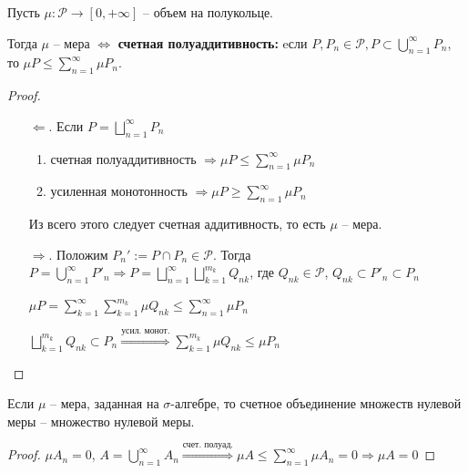 \begin{theorem}
    Пусть $\mu: \mathcal{P} \rightarrow [0, +\infty]$ – объем на полукольце. 
    
    Тогда $\mu $ – мера $\Leftrightarrow$ \textbf{счетная полуаддитивность:} eсли $P, P_n\in \mathcal{P}, P \subset\bigcup\limits_{n=1}^\infty P_n$, 
    то $\mu P \leq \sum\limits_{n=1}^\infty \mu P_n$.
\end{theorem}

\begin{proof}~
    \begin{enumerate}
        \item[$\Leftarrow$.] Если $P=\bigsqcup\limits_{n=1}^\infty P_n$
            \begin{enumerate}
                \item счетная полуаддитивность $\Rightarrow \mu P \leq \sum\limits_{n=1}^\infty \mu P_n$
                \item усиленная монотонность $\Rightarrow \mu P \geq \sum\limits_{n=1}^\infty \mu P_n$
            \end{enumerate}

            Из всего этого следует счетная аддитивность, то есть $\mu$ – мера.
        \item[$\Rightarrow$.] Положим $P_n':= P \cap P_n \in \mathcal{P}$. Тогда $P = \bigcup\limits_{n=1}^\infty P'_n\Rightarrow 
        P = \bigsqcup\limits_{n=1}^\infty\bigsqcup\limits_{k=1}^{m_k}Q_{nk}$, где $Q_{nk}\in \mathcal{P}$, $Q_{nk} \subset P'_n \subset P_n$

        $\mu P = \sum\limits_{k=1}^\infty \sum\limits_{k=1}^{m_k} \mu Q_{nk} \leq \sum \limits_{n=1}^\infty \mu P_n$

        $\bigsqcup\limits_{k=1}^{m_k} Q_{nk}\subset P_n\overset{\text{усил. монот.}}{\Rightarrow}\sum\limits_{k=1}^{m_k}\mu Q_{nk}\leq \mu P_n$
    \end{enumerate}
\end{proof}

\begin{corollary}
     Если $\mu$ – мера, заданная на $\sigma$-алгебре, то счетное объединение
     множеств нулевой меры – множество нулевой меры.
\end{corollary}

\begin{proof}
    $\mu A_n = 0$, $A=\bigcup\limits_{n=1}^\infty A_n\overset{\text{счет. полуад.}}{\Rightarrow} \mu A \leq \sum\limits_{n=1}^\infty \mu A_n=0\Rightarrow \mu A=0$
\end{proof}

